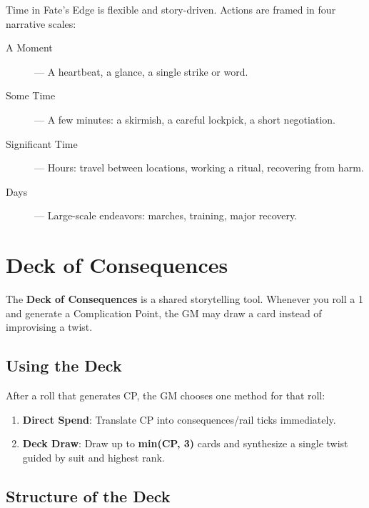 Time in Fate's Edge is flexible and story-driven. Actions are framed in four narrative scales:

\begin{description}
  \item[A Moment] — A heartbeat, a glance, a single strike or word.
  \item[Some Time] — A few minutes: a skirmish, a careful lockpick, a short negotiation.
  \item[Significant Time] — Hours: travel between locations, working a ritual, recovering from harm.
  \item[Days] — Large-scale endeavors: marches, training, major recovery.
\end{description}

\section{Deck of Consequences}

The \textbf{Deck of Consequences} is a shared storytelling tool. Whenever you roll a 1 and generate a Complication Point, the GM may draw a card instead of improvising a twist.

\subsection*{Using the Deck}

After a roll that generates CP, the GM chooses one method for that roll:
\begin{enumerate}
  \item \textbf{Direct Spend}: Translate CP into consequences/rail ticks immediately.
  \item \textbf{Deck Draw}: Draw up to \textbf{min(CP, 3)} cards and synthesize a single twist guided by suit and highest rank.
\end{enumerate}

\subsection*{Structure of the Deck}

